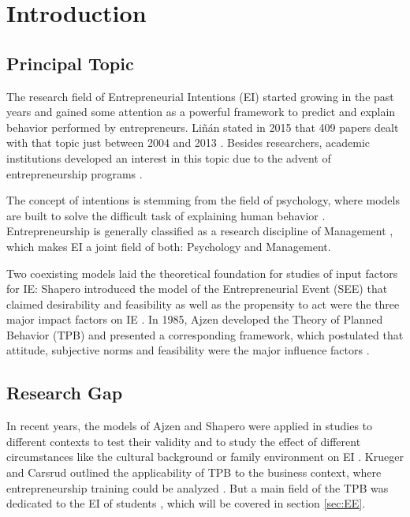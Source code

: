 \chapter{Introduction}\label{chapter:Introduction}

\renewcommand{\thepage}{\arabic{page}}
\setcounter{page}{1}

\section{Principal Topic}
The research field of Entrepreneurial Intentions (EI) started  growing in the past years and gained some attention as a powerful framework to predict and explain behavior performed by entrepreneurs. Li{\~n}{\'a}n stated in 2015 that 409 papers dealt with that topic just between 2004 and 2013 \cite{linan2015systematic}.
Besides researchers, academic institutions developed an interest in this topic due to the advent of entrepreneurship programs \cite{fayolle2015impact}.

The concept of intentions is stemming from the field of psychology, where models are built to solve the difficult task of explaining human behavior \cite{ajzen1991theory}. Entrepreneurship is generally classified as a research discipline of Management \cite{shane2000promise}, which makes EI a joint field of both: Psychology and Management. 


Two coexisting  models laid the theoretical foundation for studies of input factors for IE: Shapero introduced the model of the Entrepreneurial Event (SEE) that claimed desirability and feasibility as well as the propensity to act were the three major impact factors on IE \cite{shapero1982social,shapero1984entrepreneurial}. In 1985, Ajzen developed the Theory of Planned Behavior (TPB) and presented a corresponding  framework, which postulated that attitude, subjective norms and feasibility were the major influence factors \cite{ajzen1985intentions}.

\section{Research Gap}
In recent years, the models of Ajzen and Shapero were applied in  studies to different contexts to test their validity and to study the effect of different circumstances like the cultural background or family environment on EI \cite{laspita2012intergenerational, linan2009development,hayton2002national,mueller2001culture}. 
Krueger and Carsrud outlined the applicability of TPB to the business context, where entrepreneurship training could be analyzed \cite{krueger1993entrepreneurial}. 
But a main field of the TPB was dedicated to the EI of students \cite{fayolle2015impact}, which will be covered in section \ref{sec:EE}.

